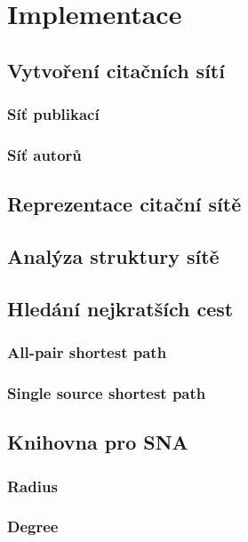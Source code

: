 \documentclass[12pt,titlepage]{report}
\begin{document}
\chapter{Implementace}

\section{Vytvoření citačních sítí}
\subsection{Síť publikací}
\subsection{Síť autorů}

\section{Reprezentace citační sítě}
\section{Analýza struktury sítě}

\section{Hledání nejkratších cest}
\subsection{All-pair shortest path}
\subsection{Single source shortest path}

\section{Knihovna pro SNA}
\subsection{Radius}
\subsection{Degree}
\end{document}

